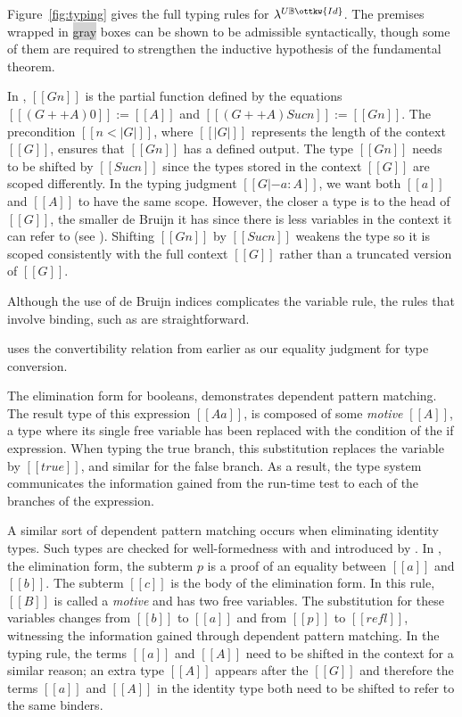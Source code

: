 \documentclass[acmsmall,screen=true,
\ifpublic review=false\else,review=true\fi
  ,anonymous=\ifanonymous true\else false\fi]{acmart}
\newcommand{\lang}{$\lambda^{U\mathbb{B}\ottkw{Id}}$\xspace}
\begin{document}
Figure~\ref{fig:typing} gives the full typing rules for \lang{}. The premises
wrapped in \colorbox{lightgray}{gray} boxes can be shown to be admissible
syntactically, though some of them are required to strengthen the inductive
hypothesis of the fundamental theorem.

In , $[[G n]]$ is the partial function defined by the equations
$[[ (G ++ A) 0 ]] := [[A]]$ and $[[ (G ++ A) Suc n ]] := [[G n]]$.  The
precondition $[[n < | G | ]]$, where $[[ | G | ]]$ represents the length of
the context $[[G]]$, ensures that $[[G n]]$ has a defined output. The type
$[[G n]]$ needs to be shifted by $[[Suc n]]$ since the types stored in the
context $[[G]]$ are scoped differently. In the typing judgment
$[[G |- a : A]]$, we want both $[[a]]$ and $[[A]]$ to have the same
scope. However, the closer a type is to the head of $[[G]]$, the smaller de
Bruijn it has since there is less variables in the context it can refer to
(see ). Shifting $[[G n]]$ by $[[Suc n]]$ weakens the type so
it is scoped consistently with the full context $[[G]]$ rather than a
truncated version of $[[G]]$.

Although the use of de Bruijn indices complicates the variable rule, the rules
that involve binding, such as  are straightforward.

 uses the convertibility relation from earlier
as our equality judgment for type conversion.

The elimination form for booleans,  demonstrates dependent pattern
matching.  The result type of this expression $[[A {a}]]$, is composed of some
\emph{motive} $[[A]]$, a type where its single free variable has been replaced
with the condition of the if expression. When typing the true branch, this
substitution replaces the variable by $[[true]]$, and similar for the false
branch. As a result, the type system communicates the information gained from
the run-time test to each of the branches of the expression.

A similar sort of dependent pattern matching occurs when eliminating identity
types. Such types are checked for well-formedness with  and
introduced by . In , the elimination form, the subterm
$p$ is a proof of an equality between $[[a]]$ and $[[b]]$. The subterm $[[c]]$
is the body of the elimination form. In this rule, $[[B]]$ is called a
\emph{motive} and has two free variables.  The substitution for these
variables changes from $[[b]]$ to $[[a]]$ and from $[[p]]$ to $[[refl]]$,
witnessing the information gained through dependent pattern matching.  In the
typing rule, the terms $[[a]]$ and $[[A]]$ need to be shifted in the context
for a similar reason; an extra type $[[A]]$ appears after the $[[G]]$ and
therefore the terms $[[a]]$ and $[[A]]$ in the identity type both need to be
shifted to refer to the same binders.
\end{document}
